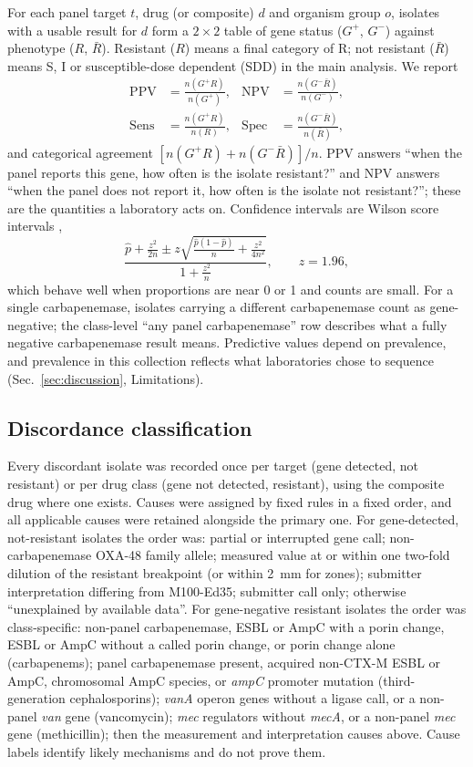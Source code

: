 \documentclass[10pt,twocolumn,letterpaper]{article}
\newcommand{\g}[1]{\textit{#1}}  %
\begin{document}
For each panel target $t$, drug (or composite) $d$ and organism group $o$, isolates with a usable result for $d$ form a
$2\times 2$ table of gene status ($G^{+}$, $G^{-}$) against phenotype ($R$, $\bar R$). Resistant ($R$) means a final
category of R; not resistant ($\bar R$) means S, I or susceptible-dose dependent (SDD) in the main analysis. We report
\begin{align}
\mathrm{PPV} &= \frac{n(G^{+}R)}{n(G^{+})}, & \mathrm{NPV} &= \frac{n(G^{-}\bar R)}{n(G^{-})},\label{eq:ppv}\\
\mathrm{Sens} &= \frac{n(G^{+}R)}{n(R)}, & \mathrm{Spec} &= \frac{n(G^{-}\bar R)}{n(\bar R)},\label{eq:sens}
\end{align}
and categorical agreement $[n(G^{+}R)+n(G^{-}\bar R)]/n$. PPV answers ``when the panel reports this gene, how often is the
isolate resistant?'' and NPV answers ``when the panel does not report it, how often is the isolate not resistant?'';
these are the quantities a laboratory acts on. Confidence intervals are Wilson score intervals \cite{wilson1927},
\begin{equation}
\frac{\hat p + \frac{z^{2}}{2n} \pm z\sqrt{\frac{\hat p(1-\hat p)}{n}+\frac{z^{2}}{4n^{2}}}}{1+\frac{z^{2}}{n}},\qquad z=1.96,
\label{eq:wilson}
\end{equation}
which behave well when proportions are near 0 or 1 and counts are small. For a single carbapenemase, isolates carrying a
different carbapenemase count as gene-negative; the class-level ``any panel carbapenemase'' row describes what a fully
negative carbapenemase result means. Predictive values depend on prevalence, and prevalence in this collection reflects
what laboratories chose to sequence (Sec.~\ref{sec:discussion}, Limitations).

\subsection{Discordance classification}

Every discordant isolate was recorded once per target (gene detected, not resistant) or per drug class (gene not detected,
resistant), using the composite drug where one exists. Causes were assigned by fixed rules in a fixed order, and all
applicable causes were retained alongside the primary one. For gene-detected, not-resistant isolates the order was: partial
or interrupted gene call; non-carbapenemase OXA-48 family allele; measured value at or within one two-fold dilution of the
resistant breakpoint (or within 2~mm for zones); submitter interpretation differing from M100-Ed35; submitter call only;
otherwise ``unexplained by available data''. For gene-negative resistant isolates the order was class-specific:
non-panel carbapenemase, ESBL or AmpC with a porin change, ESBL or AmpC without a called porin change, or porin change
alone (carbapenems); panel carbapenemase present, acquired non-CTX-M ESBL or AmpC, chromosomal AmpC species, or \g{ampC}
promoter mutation (third-generation cephalosporins); \g{vanA} operon genes without a ligase call, or a non-panel
\g{van} gene (vancomycin); \g{mec} regulators without \g{mecA}, or a non-panel \g{mec} gene (methicillin); then the
measurement and interpretation causes above. Cause labels identify likely mechanisms and do not prove them.
\end{document}
